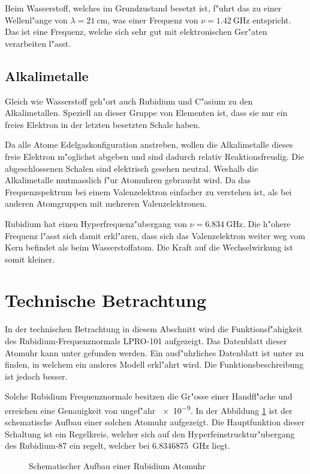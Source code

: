 \begin{refsection}
Beim Wasserstoff, welches im Grundzustand besetzt ist, f"uhrt das zu
einer Wellenl"ange von $\lambda = \SI{21}{\centi\meter}$, was einer
Frequenz von $\nu = \SI{1.42}{\giga\hertz}$ entspricht. Das ist eine
Frequenz, welche sich sehr gut mit elektronischen Ger"aten verarbeiten
l"asst.

\subsection{Alkalimetalle}
Gleich wie Wasserstoff geh"ort auch Rubidium und C"asium zu den
Alkalimetallen. Speziell an dieser Gruppe von Elementen ist, dass sie
nur ein freies Elektron in der letzten besetzten Schale haben.

Da alle Atome Edelgaskonfiguration anstreben, wollen die Alkalimetalle
dieses freie Elektron m"oglichst abgeben und sind dadurch relativ
Reaktionsfreudig.  Die abgeschlossenen Schalen sind elektrisch gesehen
neutral.  Weshalb die Alkalimetalle mutmasslich f"ur Atomuhren
gebraucht wird.  Da das Frequenzspektrum bei einem Valenzelektron
einfacher zu verstehen ist, als bei anderen Atomgruppen mit mehreren
Valenzelektronen.

Rubidium hat einen Hyperfrequenz"ubergang von $\nu =
\SI{6.834}{\giga\hertz}$. Die h"ohere Frequenz l"asst sich damit
erkl"aren, dass sich das Valenzelektron weiter weg vom Kern befindet
als beim Wasserstoffatom. Die Kraft auf die Wechselwirkung ist somit
kleiner.

\section{Technische Betrachtung}
In der technischen Betrachtung in diesem Abschnitt wird die
Funktionsf"ahigkeit des Rubidium-Frequenznormals LPRO-101 aufgezeigt.
Das Datenblatt dieser Atomuhr kann unter \cite{datasheet:lpro}
gefunden werden.  Ein ausf"uhrliches Datenblatt ist unter
\cite{datasheet:prs10m} zu finden, in welchem ein anderes Modell
erkl"ahrt wird.  Die Funktionsbeschreibung ist jedoch besser.

Solche Rubidium Frequenznormale besitzen die Gr"osse einer Handfl"ache
und erreichen eine Genauigkeit von ungef"ahr \num{e-9}.  In der
Abbildung \ref{fig:techBlock} ist der schematische Aufbau einer
solchen Atomuhr aufgezeigt.  Die Hauptfunktion dieser Schaltung ist
ein Regelkreis, welcher sich auf den Hyperfeinstrucktur"ubergang des
Rubidium-87 ein regelt, welcher bei \SI{6.8346875}{\giga\hertz} liegt.

\begin{figure}
  \centering
  
  \caption{Schematischer Aufbau einer Rubidium Atomuhr}
  \label{fig:techBlock}
\end{figure}


\end{refsection}
